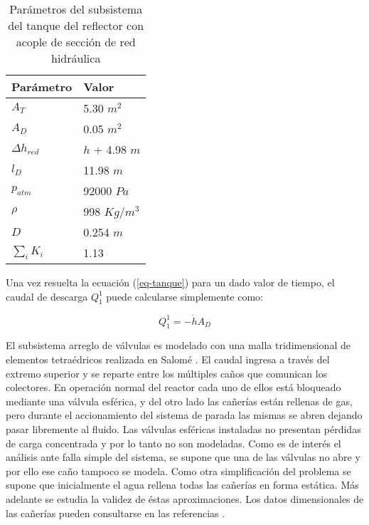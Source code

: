\begin{table}[]
\centering
\begin{tabular}{|l|l|}
\hline
Parámetro        & Valor          \\ \hline
$A_T$            & 5.30 $m^2$     \\ \hline
$A_D$            & 0.05 $m^2$     \\ \hline
$\Delta h_{red}$ & $h$ + 4.98 $m$ \\ \hline
$l_D$            & 11.98 $m$      \\ \hline
$p_{atm}$        & 92000 $Pa$     \\ \hline
$\rho$           & 998 $Kg/m^3$   \\ \hline
$D$              & 0.254 $m$      \\ \hline
$\sum_i K_i$     & 1.13           \\ \hline
\end{tabular}
\caption{Parámetros del subsistema del tanque del reflector con acople de sección de red hidráulica}
\label{tabla-tanque}
\end{table}

Una vez resuelta la ecuación (\ref{eq-tanque}) para un dado valor de tiempo,
el caudal de descarga $Q_1^1$ puede calcularse simplemente como:

\begin{equation}
Q_1^1 = -\dot{h} A_D
\label{eq-qd}
\end{equation}

El subsistema arreglo de válvulas es modelado con una malla tridimensional de elementos tetraédricos realizada en Salomé \cite{salome}.
El caudal ingresa a través del extremo superior y se reparte entre los múltiples caños que comunican los colectores.
En operación normal del reactor cada uno de ellos está bloqueado mediante una válvula esférica,
y del otro lado las cañerías están rellenas de gas,
pero durante el accionamiento del sistema de parada las mismas se abren dejando pasar libremente al fluido.
Las válvulas esféricas instaladas no presentan pérdidas de carga concentrada y por lo tanto no son modeladas.
Como es de interés el análisis ante falla simple del sistema,
se supone que una de las válvulas no abre y por ello ese caño tampoco se modela.
Como otra simplificación del problema se supone que inicialmente el agua rellena todas las cañerías en forma estática.
Más adelante se estudia la validez de éstas aproximaciones.
Los datos dimensionales de las cañerías pueden consultarse en las referencias \cite{invap-mockup}.

